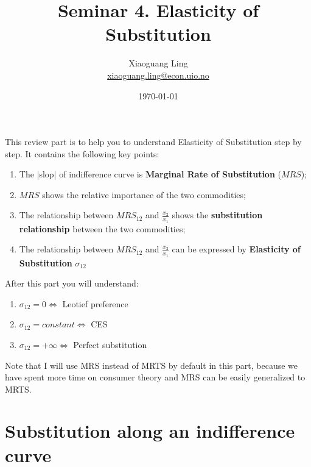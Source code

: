 \documentclass{article}
\title{Seminar 4. Elasticity of Substitution}
\author{Xiaoguang Ling \\  \href{xiaoguang.ling@econ.uio.no}{xiaoguang.ling@econ.uio.no}}
\date{\today}
\begin{document}
\maketitle

\begin{mdframed}[backgroundcolor=blue!20,linecolor=white]

This review part is to help you to understand Elasticity of Substitution step by step.
It contains the following key points:

\begin{enumerate}
\item The |slop| of indifference curve is \textbf{Marginal Rate of Substitution} ($MRS$);
\item $MRS$ shows the relative importance of the two commodities;
\item The relationship between $MRS_{12}$ and $\frac{x_2}{x_1}$ shows the \textbf{substitution relationship} between the two commodities;
\item The relationship between $MRS_{12}$ and $\frac{x_2}{x_1}$ can be expressed by \textbf{Elasticity of Substitution} $\sigma_{12}$
\end{enumerate}

After this part you will understand:

\begin{enumerate}
\item $\sigma_{12} = 0 \iff$ Leotief preference
\item $\sigma_{12} = constant \iff$ CES
\item $\sigma_{12} = + \infty \iff$ Perfect substitution
\end{enumerate}

Note that I will use MRS instead of MRTS by default in this part, because we have spent more time on consumer theory and MRS
can be easily generalized to MRTS.

\section{Substitution along an indifference curve}
\begin{center}
\end{center}
\end{mdframed}
\end{document}
